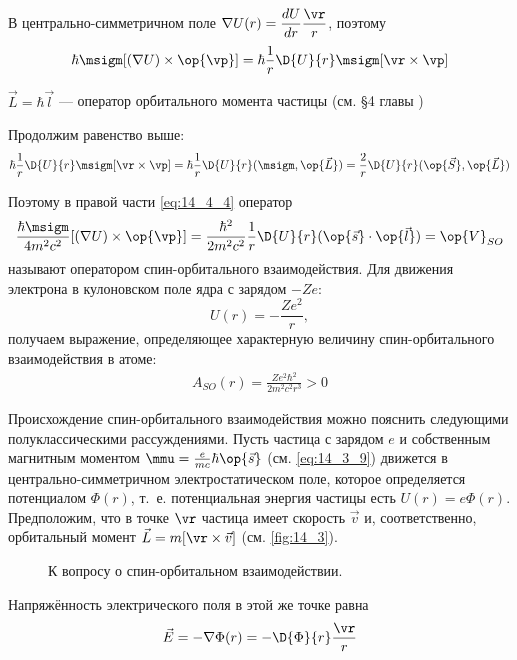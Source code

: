 В центрально-симметричном поле $\nabla U(r) = \dfrac{dU}{dr} \dfrac{\vr}{r}$, поэтому 
$$
\hbar \msigm [(\nabla U) \times \op{\vp}] = \hbar \frac{1}{r} \D{U}{r} \msigm [\vr \times \vp] 
$$

$\vec{L} = \hbar \vec{l}$ --- оператор орбитального момента частицы (см. \S 4 главы )

Продолжим равенство выше:
$$
\hbar \frac{1}{r} \D{U}{r} \msigm [\vr \times \vp] = {\hbar} \frac{1}{r} \D{U}{r} (\msigm, \op{\vec{L}}) = \frac{2}{r} \D{U}{r} (\op{\vec{S}}, \op{\vec{L}})
$$

Поэтому в правой части \eqref{eq:14_4_4} оператор 
$$
\frac{\hbar \msigm}{4m^2c^2} [(\nabla U) \times \op{\vp}] = \frac{\hbar^2}{2m^2c^2}\frac{1}{r} \D{U}{r} (\op{\vec{s}} \cdot \op{\vec{l}}) = \op{V}_{SO}
$$
называют оператором спин-орбитального взаимодействия. Для движения электрона в кулоновском поле ядра с зарядом $-Ze$:
$$
U(r) = -\frac{Ze^2}{r},
$$
получаем выражение, определяющее характерную величину спин-орбитального взаимодействия в атоме:
\begin{gather*}
\boxed{A_{SO} (r) = \frac{Ze^2 \hbar^2}{2m^2 c^2 r^3} > 0}
\end{gather*}

Происхождение спин-орбитального взаимодействия можно пояснить следующими полуклассическими рассуждениями. Пусть частица с зарядом $e$ и собственным магнитным моментом $\mmu = \frac{e}{mc}\hbar \op{\vec{s}}$ (см. \eqref{eq:14_3_9}) движется в центрально-симметричном электростатическом поле, которое определяется потенциалом $\Phi(r)$, т.~е. потенциальная энергия частицы есть $U(r)=e\Phi(r)$. Предположим, что в точке $\vr$ частица имеет скорость $\vec{v}$ и, соответственно, орбитальный момент $\vec{L} = m[\vr \times \vec{v}]$ (см. \autoref{fig:14_3}).

\begin{figure}[h!]
\centering
{}
\caption{К вопросу о спин-орбитальном взаимодействии.} \label{fig:14_3}
\end{figure}

Напряжённость электрического поля в этой же точке равна
$$
\vec{E} = - \nabla \Phi(r) = -\D{\Phi}{r} \frac{\vr}{r}
$$

